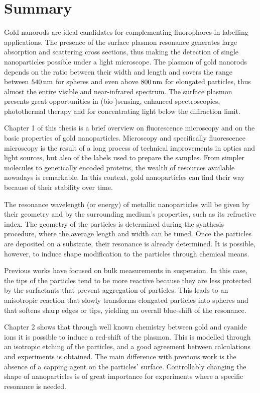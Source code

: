 \chapter*{Summary}

Gold nanorods are ideal candidates for complementing fluorophores in labelling
applications. The presence of the surface plasmon resonance generates large
absorption and scattering cross sections, thus making the detection of single
nanoparticles possible under a light microscope. The plasmon of gold nanorods
depends on the ratio between their width and length and covers the range between
$540\,\textrm{nm}$ for spheres and even above $800\,\textrm{nm}$ for elongated particles, thus
almost the entire visible and near-infrared spectrum. The surface plasmon
presents great opportunities in (bio-)sensing, enhanced spectroscopies,
photothermal therapy and for concentrating light below the diffraction limit.

Chapter 1 of this thesis is a brief overview on fluorescence microscopy and on
the basic properties of gold nanoparticles. Microscopy and specifically
fluorescence microscopy is the result of a long process of technical
improvements in optics and light sources, but also of the labels used to prepare
the samples. From simpler molecules to genetically encoded proteins, the wealth
of resources available nowadays is remarkable. In this context, gold
nanoparticles can find their way because of their stability over time. 

The resonance wavelength (or energy) of metallic nanoparticles will be given by
their geometry and by the surrounding medium's properties, such as its
refractive index. The geometry of the particles is determined during the
synthesis procedure, where the average length and width can be tuned. Once the
particles are deposited on a substrate, their resonance is already determined.
It is possible, however, to induce shape modification to the particles through
chemical means.

Previous works have focused on bulk measurements in suspension. In this case,
the tips of the particles tend to be more reactive because they are less
protected by the surfactants that prevent aggregation of particles. This leads
to an anisotropic reaction that slowly transforms elongated particles into
spheres and that softens sharp edges or tips, yielding an overall blue-shift of
the resonance.

Chapter 2 shows that through well known chemistry between gold and cyanide ions
it is possible to induce a red-shift of the plasmon. This is modelled through an
isotropic etching of the particles, and a good agreement between calculations
and experiments is obtained. The main difference with previous work is the
absence of a capping agent on the particles' surface. Controllably changing the
shape of nanoparticles is of great importance for experiments where a specific
resonance is needed.

